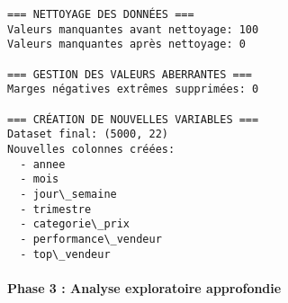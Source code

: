 \documentclass[11pt]{article}
\begin{document}
    \begin{Verbatim}[commandchars=\\\{\}]
=== NETTOYAGE DES DONNÉES ===
Valeurs manquantes avant nettoyage: 100
Valeurs manquantes après nettoyage: 0

=== GESTION DES VALEURS ABERRANTES ===
Marges négatives extrêmes supprimées: 0

=== CRÉATION DE NOUVELLES VARIABLES ===
Dataset final: (5000, 22)
Nouvelles colonnes créées:
  - annee
  - mois
  - jour\_semaine
  - trimestre
  - categorie\_prix
  - performance\_vendeur
  - top\_vendeur
    \end{Verbatim}

    \paragraph{Phase 3 : Analyse exploratoire
approfondie}\label{phase-3-analyse-exploratoire-approfondie}
\end{document}
